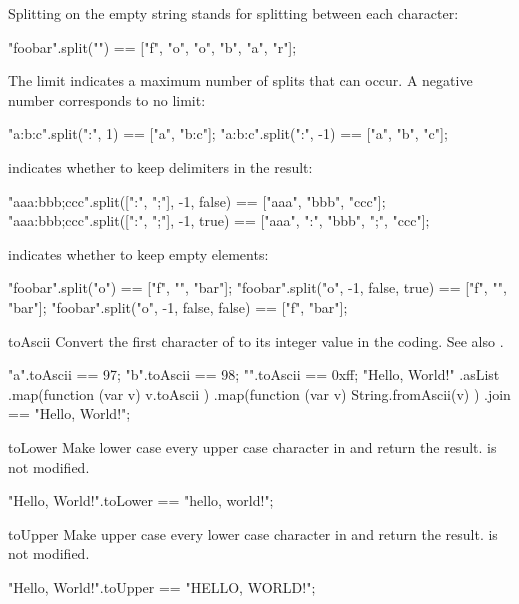 \begin{urbiscriptapi}
\noindent
Splitting on the empty string stands for splitting between each character:

\begin{urbiassert}
"foobar".split("") == ["f", "o", "o", "b", "a", "r"];
\end{urbiassert}

The limit  indicates a maximum number of splits that can occur. A
negative number corresponds to no limit:

\begin{urbiassert}
"a:b:c".split(":",  1) == ["a", "b:c"];
"a:b:c".split(":", -1) == ["a", "b", "c"];
\end{urbiassert}

 indicates whether to keep delimiters in the result:

\begin{urbiassert}
"aaa:bbb;ccc".split([":", ";"], -1, false) == ["aaa",      "bbb",      "ccc"];
"aaa:bbb;ccc".split([":", ";"], -1, true)  == ["aaa", ":", "bbb", ";", "ccc"];
\end{urbiassert}

 indicates whether to keep empty elements:

\begin{urbiassert}
"foobar".split("o")                   == ["f", "", "bar"];
"foobar".split("o", -1, false, true)  == ["f", "", "bar"];
"foobar".split("o", -1, false, false) == ["f",     "bar"];
\end{urbiassert}


\item[toAscii] Convert the first character of \this to its integer value in
  the  coding.  See also .
\begin{urbiassert}
   "a".toAscii == 97;
   "b".toAscii == 98;
"\xff".toAscii == 0xff;
"Hello, World!\n"
  .asList
  .map(function (var v) { v.toAscii })
  .map(function (var v) { String.fromAscii(v) })
  .join
  == "Hello, World!\n";
\end{urbiassert}


\item[toLower]
  Make lower case every upper case character in \this and
  return the result.  \this is not modified.
\begin{urbiassert}
"Hello, World!".toLower == "hello, world!";
\end{urbiassert}


\item[toUpper]
  Make upper case every lower case character in \this and
  return the result.  \this is not modified.
\begin{urbiassert}
"Hello, World!".toUpper == "HELLO, WORLD!";
\end{urbiassert}
\end{urbiscriptapi}

